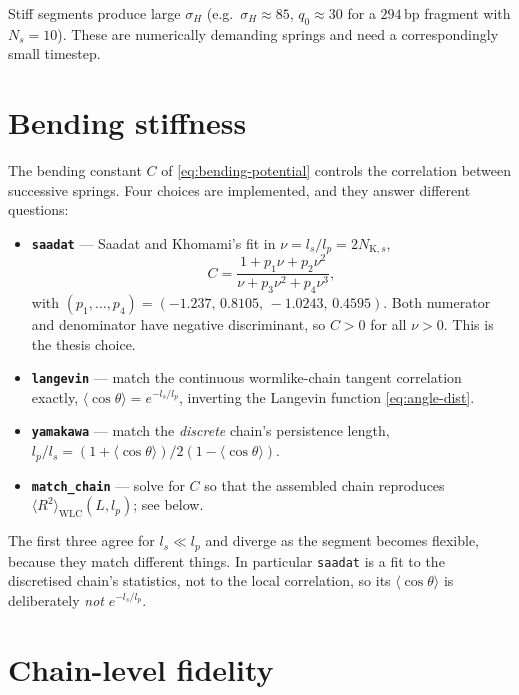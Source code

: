 \documentclass[11pt,a4paper]{report}
\newcommand{\code}[1]{\texttt{\seqsplitcode{#1}}}
\newcommand{\seqsplitcode}[1]{#1}
\begin{document}
Stiff segments produce large $\sigma_H$ (e.g.\ $\sigma_H \approx 85$, $q_0\approx30$
for a $294$\,bp fragment with $N_s = 10$). These are numerically demanding springs
and need a correspondingly small timestep.

\section{Bending stiffness}
\label{sec:cg-bending}

The bending constant $C$ of \eqref{eq:bending-potential} controls the correlation
between successive springs. Four choices are implemented, and they answer
different questions:

\begin{itemize}
  \item \textbf{\code{saadat}} --- Saadat and Khomami's fit in $\nu = l_s/l_p =
        2N_{\mathrm{K},s}$,
        \begin{equation}
          C = \frac{1 + p_1\nu + p_2\nu^{2}}{\nu + p_3\nu^{2} + p_4\nu^{3}},
        \end{equation}
        with $(p_1,\dots,p_4) = (-1.237,\,0.8105,\,-1.0243,\,0.4595)$. Both
        numerator and denominator have negative discriminant, so $C>0$ for all
        $\nu>0$. This is the thesis choice.
  \item \textbf{\code{langevin}} --- match the continuous wormlike-chain tangent
        correlation exactly, $\langle\cos\theta\rangle = e^{-l_s/l_p}$, inverting
        the Langevin function \eqref{eq:angle-dist}.
  \item \textbf{\code{yamakawa}} --- match the \emph{discrete} chain's persistence
        length, $l_p/l_s = (1+\langle\cos\theta\rangle)/2(1-\langle\cos\theta\rangle)$.
  \item \textbf{\code{match\_chain}} --- solve for $C$ so that the assembled chain
        reproduces $\langle R^{2}\rangle_{\mathrm{WLC}}(L, l_p)$; see below.
\end{itemize}
The first three agree for $l_s \ll l_p$ and diverge as the segment becomes
flexible, because they match different things. In particular \code{saadat} is a fit
to the discretised chain's statistics, not to the local correlation, so its
$\langle\cos\theta\rangle$ is deliberately \emph{not} $e^{-l_s/l_p}$.

\section{Chain-level fidelity}
\label{sec:cg-chain}
\end{document}
